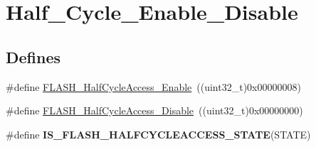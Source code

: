 \hypertarget{group__Half__Cycle__Enable__Disable}{
\section{Half\_\-Cycle\_\-Enable\_\-Disable}
\label{group__Half__Cycle__Enable__Disable}
}
\subsection*{Defines}
\begin{DoxyCompactItemize}
\item 
\#define \hyperlink{group__Half__Cycle__Enable__Disable_ga95adf58ccf48094a9648085ac8d8af13}{FLASH\_\-HalfCycleAccess\_\-Enable}~((uint32\_\-t)0x00000008)
\item 
\#define \hyperlink{group__Half__Cycle__Enable__Disable_gad1ec816fa04b9a45e51c1cc9f1ba8f42}{FLASH\_\-HalfCycleAccess\_\-Disable}~((uint32\_\-t)0x00000000)
\item 
\#define {\bfseries IS\_\-FLASH\_\-HALFCYCLEACCESS\_\-STATE}(STATE)
\end{DoxyCompactItemize}


